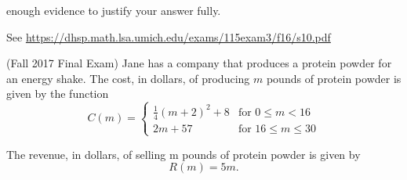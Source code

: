 \documentclass[11pt]{exam}
\begin{document}
\begin{questions}
\begin{enumerate}[(a)]
enough evidence to justify your answer fully.
\end{enumerate}
\begin{solution}
  See \href{https://dhsp.math.lsa.umich.edu/exams/115exam3/f16/s10.pdf}{https://dhsp.math.lsa.umich.edu/exams/115exam3/f16/s10.pdf}
\end{solution}
\question (Fall 2017 Final Exam) %
	Jane has a company that produces a protein powder for an energy shake. The cost, in dollars, of producing $m$ pounds of protein powder is given by the function
	$$C(m)=\left\lbrace \begin{array}{ll} \frac{1}{4} (m+2)^2+8 & \textrm{for } 0 \leqslant m < 16 \\ 2m+57 & \textrm{for } 16 \leqslant m \leqslant 30 \end{array}\right.$$
	
	The revenue, in dollars, of selling m pounds of protein powder is given by
	$$R(m)=5m.$$
	

\end{questions}
\end{document}
